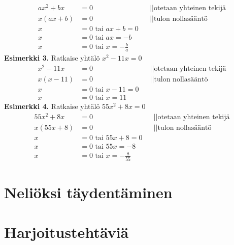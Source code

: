 \begin{enumerate}
 \\
\begin{align*}
ax^2+bx&=0 \ \ \ \ \ &&||\text{otetaan yhteinen tekijä} \\
x(ax+b)&=0 \ \ \ \ \ &&||\text{tulon nollasääntö} \\
x&=0 \text{ tai } ax+b=0 \\
x&=0 \text{ tai } ax=-b \\
x&=0 \text{ tai } x=-\frac{b}{a}
\end{align*}
\textbf{Esimerkki 3.}
Ratkaise yhtälö $x^2-11x=0$
\begin{align*}
x^2-11x&=0 \ \ \ \ \  &&||\text{otetaan yhteinen tekijä} \\
x(x-11)&=0 \ \ \ \ \ &&||\text{tulon nollasääntö} \\
x&=0 \text{ tai } x-11=0 \\ 
x&=0 \text{ tai } x=11
\end{align*} 
\textbf{Esimerkki 4.}
Ratkaise yhtälö $55x^2+8x=0$
\begin{align*}
55x^2+8x&=0 \ \ \ \ \ &&||\text{otetaan yhteinen tekijä} \\
x(55x+8)&=0 \ \ \ \ \ &&||\text{tulon nollasääntö} \\
x&=0 \text{ tai } 55x+8=0 \\
x&=0 \text{ tai } 55x=-8 \\
x&=0 \text{ tai } x=-\frac{8}{55}
\end{align*}
\end{enumerate}
\section{Neliöksi täydentäminen}

\section{Harjoitustehtäviä}
